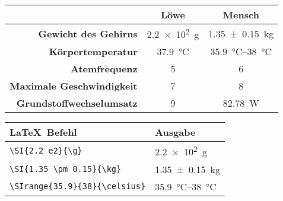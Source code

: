 \begin{frame}[fragile]
	\Losung
	\begin{outputbox}
		\begin{center}
			\begin{tabular}{r|cc}
				\hline
				&	\textbf{Löwe}										& \textbf{Mensch} 						\\ \hline
				\textbf{Gewicht des Gehirns}		&	\SI{2.2 e2}{\g}										& \SI{1.35 \pm 0.15}{\kg}			\\ 
				\textbf{Körpertemperatur}			&	\SI{37.9}{\celsius}							& \SIrange{35.9}{38}{\degreeCelsius}	\\
				\textbf{Atemfrequenz}				&	5								& 6 					\\
				\textbf{Maximale Geschwindigkeit}	&	7								& 8				\\ 
				\textbf{Grundstoffwechselumsatz}	& 9	&  \SI{82.78}{\watt}\\
				\hline
			\end{tabular}
		\end{center}
	\end{outputbox}

				\begin{center}
		\begin{tabular}{ll}
			\toprule
			\LaTeX\ Befehl						&	Ausgabe						\\ \midrule
			\lstinline|\SI{2.2 e2}{\g} |			&	\SI{2.2 e2}{\g} 					\\
			\lstinline|\SI{1.35 \pm 0.15}{\kg}|		&	\SI{1.35 \pm 0.15}{\kg}			\\
			\lstinline|\SIrange{35.9}{38}{\celsius}|		&	\SIrange{35.9}{38}{\celsius}			\\
			\bottomrule
		\end{tabular}
	\end{center}
	
	
\end{frame}

